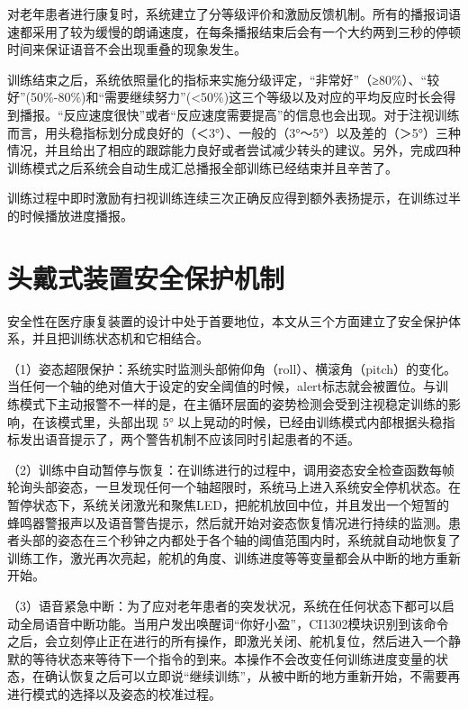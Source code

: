 对老年患者进行康复时，系统建立了分等级评价和激励反馈机制。所有的播报词语速都采用了较为缓慢的朗诵速度，在每条播报结束后会有一个大约两到三秒的停顿时间来保证语音不会出现重叠的现象发生。

训练结束之后，系统依照量化的指标来实施分级评定，“非常好”（≥80\%）、“较好”(50\%-80\%)和“需要继续努力”(<50\%)这三个等级以及对应的平均反应时长会得到播报。“反应速度很快”或者“反应速度需要提高”的信息也会出现。对于注视训练而言，用头稳指标划分成良好的（＜3°）、一般的（3°～5°）以及差的（＞5°）三种情况，并且给出了相应的跟踪能力良好或者尝试减少转头的建议。另外，完成四种训练模式之后系统会自动生成汇总播报全部训练已经结束并且辛苦了。

训练过程中即时激励有扫视训练连续三次正确反应得到额外表扬提示，在训练过半的时候播放进度播报。

\section{头戴式装置安全保护机制}

安全性在医疗康复装置的设计中处于首要地位，本文从三个方面建立了安全保护体系，并且把训练状态机和它相结合。

（1）姿态超限保护：系统实时监测头部俯仰角（roll）、横滚角（pitch）的变化。当任何一个轴的绝对值大于设定的安全阈值的时候，alert标志就会被置位。与训练模式下主动报警不一样的是，在主循环层面的姿势检测会受到注视稳定训练的影响，在该模式里，头部出现 5° 以上晃动的时候，已经由训练模式内部根据头稳指标发出语音提示了，两个警告机制不应该同时引起患者的不适。

（2）训练中自动暂停与恢复：在训练进行的过程中，调用姿态安全检查函数每帧轮询头部姿态，一旦发现任何一个轴超限时，系统马上进入系统安全停机状态。在暂停状态下，系统关闭激光和聚焦LED，把舵机放回中位，并且发出一个短暂的蜂鸣器警报声以及语音警告提示，然后就开始对姿态恢复情况进行持续的监测。患者头部的姿态在三个秒钟之内都处于各个轴的阈值范围内时，系统就自动地恢复了训练工作，激光再次亮起，舵机的角度、训练进度等等变量都会从中断的地方重新开始。

（3）语音紧急中断：为了应对老年患者的突发状况，系统在任何状态下都可以启动全局语音中断功能。当用户发出唤醒词“你好小盈”，CI1302模块识别到该命令之后，会立刻停止正在进行的所有操作，即激光关闭、舵机复位，然后进入一个静默的等待状态来等待下一个指令的到来。本操作不会改变任何训练进度变量的状态，在确认恢复之后可以立即说“继续训练”，从被中断的地方重新开始，不需要再进行模式的选择以及姿态的校准过程。

